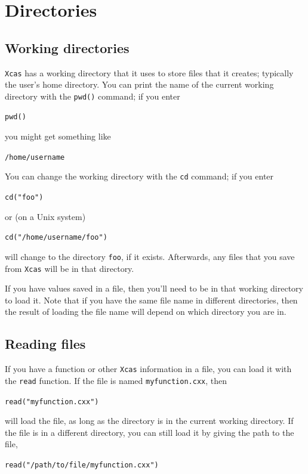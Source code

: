 \documentclass[a4paper,11pt]{book}
\begin{document}
\section{Directories}

\subsection{Working directories}

\texttt{Xcas} has a working directory that it uses to store files that
it creates; typically the user's home directory.  You can print the
name of the current working directory with the
\texttt{pwd()} command; if you enter
\begin{center}
  {\tt pwd()}
\end{center}
you might get something like
\begin{center}
  {\tt /home/username}
\end{center}

You can change the working directory with the \texttt{cd}
command; if you enter
\begin{center}
  {\tt cd("foo")}
\end{center}
or (on a Unix system)
\begin{center}
  {\tt cd("/home/username/foo")}
\end{center}
will change to the directory \texttt{foo}, if it exists.
Afterwards, any files that you save from \texttt{Xcas} will be in that
directory.  

If you have values saved in a file, then you'll need to be in that
working directory to load it.  Note that if you have the same file
name in different directories, then the result of loading the file
name will depend on which directory you are in.

\subsection{Reading files}

If you have a function or other \texttt{Xcas} information in a file,
you can load it with the \texttt{read} function.  If the
file is named \texttt{myfunction.cxx}, then
\begin{center}
  {\tt read("myfunction.cxx")}
\end{center}
will load the file, as long as the directory is in the current working
directory.  If the file is in a different directory, you can still
load it by giving the path to the file,
\begin{center}
  {\tt read("/path/to/file/myfunction.cxx")}
\end{center}
\end{document}
